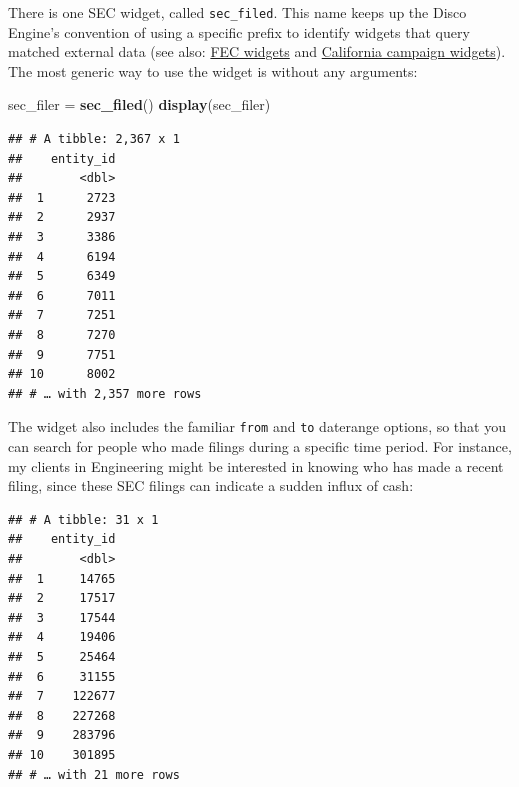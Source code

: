 \documentclass[]{book}
\newenvironment{Shaded}{\begin{snugshade}}{\end{snugshade}}
\newcommand{\DataTypeTok}[1]{\textcolor[rgb]{0.13,0.29,0.53}{#1}}
\newcommand{\DecValTok}[1]{\textcolor[rgb]{0.00,0.00,0.81}{#1}}
\newcommand{\KeywordTok}[1]{\textcolor[rgb]{0.13,0.29,0.53}{\textbf{#1}}}
\newcommand{\NormalTok}[1]{#1}
\newcommand{\OperatorTok}[1]{\textcolor[rgb]{0.81,0.36,0.00}{\textbf{#1}}}
\newcommand{\StringTok}[1]{\textcolor[rgb]{0.31,0.60,0.02}{#1}}
\begin{document}
There is one SEC widget, called \texttt{sec\_filed}. This name keeps up the Disco Engine's convention of using a specific prefix to identify widgets that query matched external data (see also: \protect\hyperlink{ex-fec}{FEC widgets} and \protect\hyperlink{ex-ca-campaign}{California campaign widgets}). The most generic way to use the widget is without any arguments:

\begin{Shaded}
\begin{Highlighting}[]
\NormalTok{sec_filer =}\StringTok{ }\KeywordTok{sec_filed}\NormalTok{()}
\KeywordTok{display}\NormalTok{(sec_filer)}
\end{Highlighting}
\end{Shaded}

\begin{verbatim}
## # A tibble: 2,367 x 1
##    entity_id
##        <dbl>
##  1      2723
##  2      2937
##  3      3386
##  4      6194
##  5      6349
##  6      7011
##  7      7251
##  8      7270
##  9      7751
## 10      8002
## # … with 2,357 more rows
\end{verbatim}

The widget also includes the familiar \texttt{from} and \texttt{to} daterange options, so that you can search for people who made filings during a specific time period. For instance, my clients in Engineering might be interested in knowing who has made a recent filing, since these SEC filings can indicate a sudden influx of cash:

\begin{Shaded}
\end{Shaded}

\begin{verbatim}
## # A tibble: 31 x 1
##    entity_id
##        <dbl>
##  1     14765
##  2     17517
##  3     17544
##  4     19406
##  5     25464
##  6     31155
##  7    122677
##  8    227268
##  9    283796
## 10    301895
## # … with 21 more rows
\end{verbatim}
\end{document}
